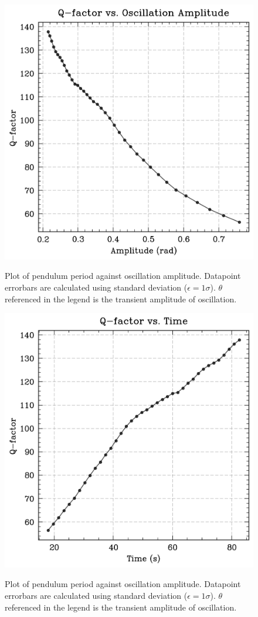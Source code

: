 \documentclass[prl,twocolumn,amsmath,amssymb,superscriptaddress]{revtex4-2}
\begin{document}
\begin{figure}[htb]
    \includegraphics[width=0.8\linewidth]{q_amplitude.png}
    \label{fig:q_amp}
    \caption{Plot of pendulum period against oscillation amplitude. Datapoint errorbars are calculated using standard deviation ($\epsilon = 1\sigma$). $\theta$ referenced in the legend is the transient amplitude of oscillation.}
\end{figure}
\begin{figure}[htb]
    \includegraphics[width=0.8\linewidth]{q-time.png}
    \label{fig:q_time}
    \caption{Plot of pendulum period against oscillation amplitude. Datapoint errorbars are calculated using standard deviation ($\epsilon = 1\sigma$). $\theta$ referenced in the legend is the transient amplitude of oscillation.}
\end{figure}
\end{document}
